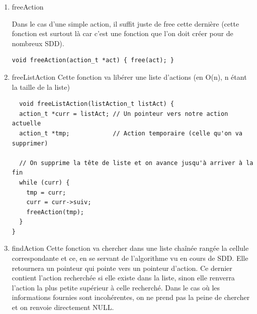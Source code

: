 \documentclass[11pt]{article}
\begin{document}
\begin{enumerate}
\item freeAction
\label{sec:org0c58994}

Dans le cas d'une simple action, il suffit juste de free cette dernière
(cette fonction est surtout là car c'est une fonction que l'on doit créer
pour de nombreux SDD).

\begin{lstlisting}
void freeAction(action_t *act) { free(act); }
\end{lstlisting}


\item freeListAction
\label{sec:orgf575573}
Cette fonction va libérer une liste d'actions (en O(n), n étant la taille
de la liste)

\begin{lstlisting}
  void freeListAction(listAction_t listAct) {
  action_t *curr = listAct; // Un pointeur vers notre action actuelle
  action_t *tmp;            // Action temporaire (celle qu'on va supprimer)

  // On supprime la tête de liste et on avance jusqu'à arriver à la fin
  while (curr) {
    tmp = curr;
    curr = curr->suiv;
    freeAction(tmp);
  }
}
\end{lstlisting}


\item findAction
\label{sec:org837d14c}
Cette fonction va chercher dans une liste chaînée rangée la cellule
correspondante et ce, en se servant de l'algorithme vu en cours de SDD. Elle
retournera un pointeur qui pointe vers un pointeur d'action. Ce dernier
contient l'action recherchée si elle existe dans la liste,
sinon elle renverra l'action la plus petite supérieur à celle recherché.
Dans le cas où les informations
fournies sont incohérentes, on ne prend pas la peine de chercher et on
renvoie directement NULL.


\end{enumerate}
\end{document}
